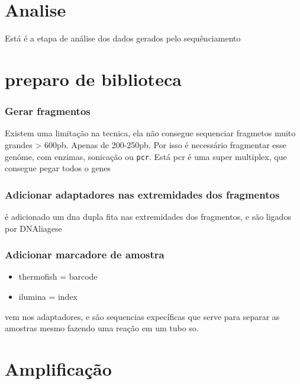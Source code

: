 \documentclass[
  letterpaper,
  DIV=11,
  numbers=noendperiod]{scrartcl}
\providecommand{\tightlist}{%
  \setlength{\itemsep}{0pt}\setlength{\parskip}{0pt}}\usepackage{longtable,booktabs,array}
\begin{document}
\section{Analise}\label{analise}

Está é a etapa de análise dos dados gerados pelo sequênciamento

\section{preparo de biblioteca}\label{preparo-de-biblioteca}

\subsubsection{Gerar fragmentos}\label{gerar-fragmentos}

Existem uma limitação na tecnica, ela não consegue sequenciar fragmetos
muito grandes \textgreater{} 600pb. Apenas de 200-250pb. Por isso é
necessário fragmentar esse genôme, com enzimas, sonicação ou
\texttt{pcr}. Está pcr é uma super multiplex, que consegue pegar todos o
genes

\subsubsection{Adicionar adaptadores nas extremidades dos
fragmentos}\label{adicionar-adaptadores-nas-extremidades-dos-fragmentos}

é adicionado um dna dupla fita nas extremidades dos fragmentos, e são
ligados por DNAliagese

\subsubsection{Adicionar marcadore de
amostra}\label{adicionar-marcadore-de-amostra}

\begin{itemize}
\tightlist
\item
  thermofish = barcode
\item
  ilumina = index
\end{itemize}

vem nos adaptadores, e são sequencias expecíficas que serve para separar
as amostras mesmo fazendo uma reação em um tubo so.

\section{Amplificação}\label{amplificauxe7uxe3o-1}
\end{document}
